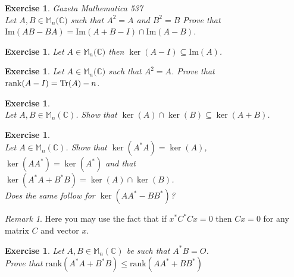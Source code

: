 \documentclass[12pt]{article}
\newcommand{\Rank}{\mathrm{rank}}
\theoremstyle{definition}
\theoremstyle{remark}
\newtheorem*{remark}{Remark}
\theoremstyle{plain}
\newtheorem{ex}[subsubsection]{Exercise}
\begin{document}
\begin{ex}\textup{Gazeta Mathematica 537}\\
    Let $A,B\in \mathbb{M}_n(\mathbb{C)}$ such that $A^2=A$ and $B^2=B$ Prove that $\mathrm{Im}(AB-BA)=\mathrm{Im}(A+B-I)\cap \mathrm{Im}(A-B)$.
\end{ex}
\begin{ex}
    Let $A\in \mathbb{M}_n(\mathbb{C)}$ then $\ker(A-I)\subseteq \mathrm{Im}(A)$.
\end{ex}
\begin{ex}
    Let $A\in \mathbb{M}_n(\mathbb{C)}$ such that $A^2=A$. Prove that $\rank(A-I)=\mathrm{Tr}(A)-n$.
\end{ex}
\begin{ex}\leavevmode \\
    Let $A,B\in \mathbb{M}_n(\mathbb{C})$. Show that $\ker(A)\cap \ker(B)\subseteq \ker(A+B)$.
\end{ex}
\begin{ex}\leavevmode \\
   Let $A\in \mathbb{M}_n(\mathbb{C})$. Show that $\ker(A^*A)=\ker(A)$, $\ker(AA^*)=\ker(A^*)$
   and that $\ker(A^*A+B^*B)=\ker(A)\cap \ker(B)$.\\
   Does the same follow for $\ker(AA^*-BB^*)$?
\end{ex}
\begin{remark}
    Here you may use the fact that if $x^*C^*Cx=0$ then $Cx=0$ for any matrix $C$ and vector $x$. 
\end{remark}
\begin{ex}
    Let $A,B\in \mathbb{M}_n(\mathbb{C})$ be such that $A^*B=O$.\\
    Prove that $\Rank(A^*A+B^*B)\leq \Rank(AA^*+BB^*)$
\end{ex}
\end{document}
